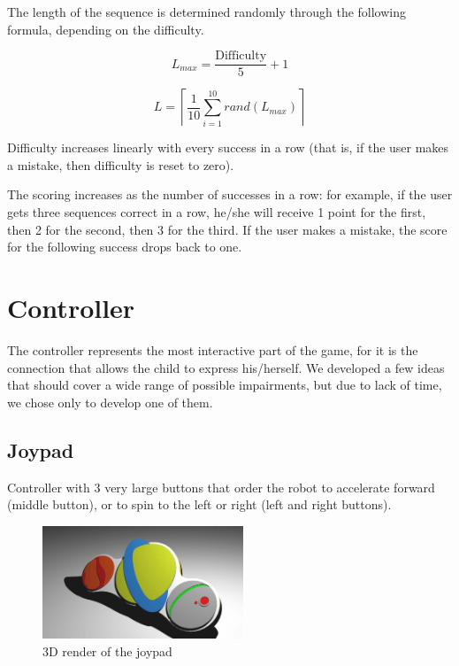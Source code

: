 \documentclass[a4paper,twoside]{book}
\begin{document}
\begin{description}
The length of the sequence is determined randomly through the following formula, depending on the difficulty. 

\[L_{max} = \frac{\mathrm{Difficulty}}{5}+1\]

\[L = \left \lceil \frac{1}{10}\sum_{i=1}^{10} rand\left(L_{max}\right) \right \rceil\]

Difficulty increases linearly with every success in a row (that is, if the user makes a mistake, then difficulty is reset to zero).

The scoring increases as the number of successes in a row: for example, if the user gets three sequences correct in a row, he/she will receive 1 point for the first, then 2 for the second, then 3 for the third. If the user makes a mistake, the score for the following success drops back to one.
\end{description}

\section{Controller}

The controller represents the most interactive part of the game, for it is the connection that allows the child to express his/herself.
We developed a few ideas that should cover a wide range of possible impairments, but due to lack of time, we chose only to develop one of them.

\subsection{Joypad}
Controller with 3 very large buttons that order the robot to accelerate forward (middle button), or to spin to the left or right (left and right buttons).

\begin{figure}
 \includegraphics[width=6cm]{img/controller.eps}
 \caption{3D render of the joypad}
\end{figure}
\end{document}
